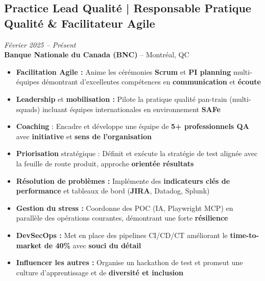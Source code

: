 \documentclass[11pt,a4paper]{article}
\newcommand{\highlight}[1]{\textcolor{primaryblue}{\textbf{#1}}}
\newcommand{\keypoint}[1]{\textbf{#1}}
\begin{document}
\subsection*{Practice Lead Qualité | Responsable Pratique Qualité \& Facilitateur Agile} \hfill \textit{\color{mediumgray}Février 2025 -- Présent}\\
\textcolor{primaryblue}{\textbf{Banque Nationale du Canada (BNC)}} -- Montréal, QC
\begin{itemize}[leftmargin=22pt]
    \item \highlight{Facilitation Agile :} Anime les cérémonies \highlight{Scrum} et \highlight{PI planning} multi-équipes démontrant d'excellentes compétences en \highlight{communication} et \highlight{écoute}
    \item \highlight{Leadership} et \highlight{mobilisation :} Pilote la pratique qualité pan-train (multi-squads) incluant équipes internationales en environnement \highlight{SAFe}
    \item \highlight{Coaching} : Encadre et développe une équipe de \keypoint{5+ professionnels QA} avec \highlight{initiative} et \highlight{sens de l'organisation}
    \item \highlight{Priorisation} stratégique : Définit et exécute la stratégie de test alignée avec la feuille de route produit, approche \highlight{orientée résultats}
    \item \highlight{Résolution de problèmes :} Implémente des \highlight{indicateurs clés de performance} et tableaux de bord (\highlight{JIRA}, Datadog, Splunk)
    \item \highlight{Gestion du stress :} Coordonne des POC (IA, Playwright MCP) en parallèle des opérations courantes, démontrant une forte \highlight{résilience}
    \item \highlight{DevSecOps :} Met en place des pipelines CI/CD/CT améliorant le \keypoint{time-to-market de 40\%} avec \highlight{souci du détail}
    \item \highlight{Influencer les autres :} Organise un hackathon de test et promeut une culture d'apprentissage et de \highlight{diversité et inclusion}
\end{itemize}
\end{document}

